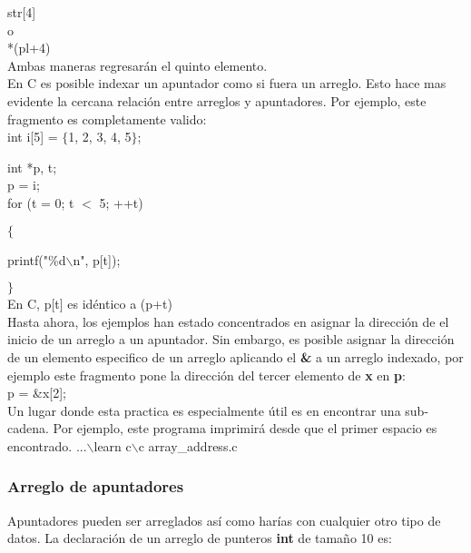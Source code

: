 \documentclass[]{article}
\begin{document}
	str[4]\\
	
	o\\
	
	*(pl+4)\\
	
	Ambas maneras regresarán el quinto elemento.\\
	
	En C es posible indexar un apuntador como si fuera un arreglo. Esto hace mas evidente la cercana relación entre arreglos y apuntadores. Por ejemplo, este fragmento es completamente valido:\\
	
	int i[5] = $\lbrace$1, 2, 3, 4, 5$\rbrace$;
	
	int *p, t;\\
	
	p = i;\\
	
	for (t = 0; t $<$ 5; ++t)
	
	$\lbrace$
	
		printf("\%d$\backslash$n", p[t]);
		
	$\rbrace$\\
	
	En C, p[t] es idéntico a (p+t)\\
	
	Hasta ahora,  los ejemplos han estado concentrados en asignar la dirección de el inicio de un arreglo a un apuntador. Sin embargo, es posible asignar la dirección de un elemento especifico de un arreglo aplicando el \textbf{\&} a un arreglo indexado, por ejemplo este fragmento pone la dirección del tercer elemento de \textbf{x} en \textbf{p}:\\
	
	p = \&x[2];\\
	
	Un lugar donde esta practica es especialmente útil es en encontrar una sub-cadena. Por ejemplo, este programa imprimirá desde que el primer espacio es encontrado. ...$\backslash$learn c$\backslash$c array\_address.c\\
	
	\subsubsection{Arreglo de apuntadores}
	
	Apuntadores pueden ser arreglados así como harías con cualquier otro tipo de datos. La declaración de  un arreglo de punteros \textbf{int}  de tamaño 10 es:\\
	
\end{document}
